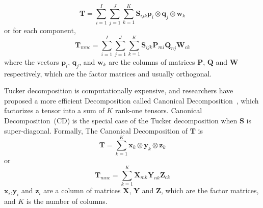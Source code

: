 \begin{equation*}
\mathbf{T}=\sum\limits_{i=1}^{I}\sum\limits_{j=1}^{J}\sum\limits_{k=1}^{K}\mathbf{S}_{ijk}\mathbf{p}_i\otimes \mathbf{q}_j\otimes \mathbf{w}_k
\end{equation*}
or for each component,
\begin{equation*}
\mathbf{T}_{mnc}=\sum\limits_{i=1}^{I}\sum\limits_{j=1}^{J}\sum\limits_{k=1}^{K}\mathbf{S}_{ijk}\mathbf{P}_{m i}\mathbf{Q}_{n j}\mathbf{W}_{c k}
\end{equation*}
where the vectors $\mathbf{p}_i$, $\mathbf{q}_j$, and $\mathbf{w}_k$ are the columns of matrices $\mathbf{P}$, $\mathbf{Q}$ and $\mathbf{W}$ respectively, which are the factor matrices and usually orthogonal.


Tucker decomposition is computationally expensive, and researchers have proposed a more efficient Decomposition called Canonical Decomposition~\cite{carrol1970CD}, which factorizes a tensor into a sum of $K$ rank-one tensors.
Canonical Decomposition~(CD) is the special case of the Tucker decomposition when $\mathbf{S}$ is super-diagonal.
Formally, The Canonical Decomposition of $\mathbf{T}$ is
\begin{equation*}
\mathbf{T}=\sum\limits_{k=1}^{K}\mathbf{x}_k\otimes \mathbf{y}_k\otimes \mathbf{z}_k
\end{equation*}
or
\begin{equation*}
\mathbf{T}_{mnc}=\sum\limits_{k=1}^{K}\mathbf{X}_{m k} \mathbf{Y}_{n k} \mathbf{Z}_{c k}
\end{equation*}
$\mathbf{x}_i$,$\mathbf{y}_i$ and $\mathbf{z}_i$ are a column of matrices $\mathbf{X}$, $\mathbf{Y}$ and $\mathbf{Z}$, which are the factor matrices, and $K$ is the number of columns. 


